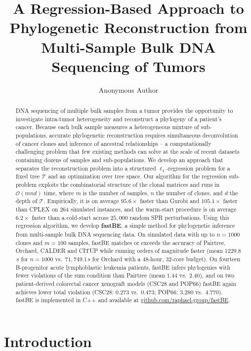 \documentclass[11pt]{article}
\title{A Regression-Based Approach to Phylogenetic Reconstruction from Multi-Sample Bulk DNA Sequencing of Tumors}
\author[1]{Anonymous Author}
\affil[1]{Anonymous Institution}
\date{}
\begin{document}
\maketitle

\begin{abstract}
DNA sequencing of multiple bulk samples from a tumor provides the opportunity to investigate intra-tumor heterogeneity and reconstruct a phylogeny of a patient's cancer. Because each bulk sample measures a heterogeneous mixture of sub-populations, accurate phylogenetic reconstruction requires simultaneous deconvolution of cancer clones and inference of ancestral relationships -- a computationally challenging problem that few existing methods can solve at the scale of recent datasets containing dozens of samples and sub-populations. We develop an approach that separates the reconstruction problem into a structured $\ell_1$-regression problem for a fixed tree $\mathcal{T}$ and an optimization over tree space. Our algorithm for the regression sub-problem exploits the combinatorial structure of the clonal matrices and runs in $\mathcal{O}(mnd)$ time, where $m$ is the number of samples, $n$ the number of clones, and $d$ the depth of $\mathcal{T}$. Empirically, it is on average $95.6\times$ faster than Gurobi and $105.1\times$ faster than CPLEX on $264$ simulated instances, and the warm-start procedure is on average $6.2\times$ faster than a cold-start across $25{,}000$ random SPR perturbations. Using this regression algorithm, we develop \textbf{fastBE}, a simple method for phylogenetic inference from multi-sample bulk DNA sequencing data. On simulated data with up to $n=1000$ clones and $m=100$ samples, fastBE matches or exceeds the accuracy of Pairtree, Orchard, CALDER and CITUP while running orders of magnitude faster (mean $1229.8$\,s for $n=1000$ vs.\ $71{,}749.1$\,s for Orchard with a 48-hour, 32-core budget). On fourteen B-progenitor acute lymphoblastic leukemia patients, fastBE infers phylogenies with fewer violations of the sum condition than Pairtree (mean $1.44$ vs.\ $2.40$), and on two patient-derived colorectal cancer xenograft models (CSC28 and POP66) fastBE again achieves lower total violation (CSC28: $0.273$ vs.\ $0.473$; POP66: $3.280$ vs.\ $4.770$). fastBE is implemented in C++ and available at \url{github.com/raphael-group/fastBE}.
\end{abstract}

\section{Introduction}
\end{document}
